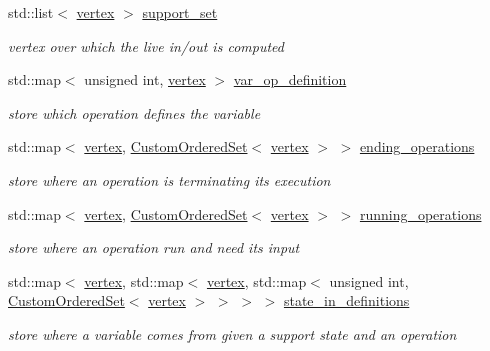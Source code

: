 \begin{DoxyCompactItemize}
std\+::list$<$ \hyperlink{graph_8hpp_abefdcf0544e601805af44eca032cca14}{vertex} $>$ \hyperlink{classliveness_a5b11078a7c95877d980deebb160d8f08}{support\+\_\+set}
\begin{DoxyCompactList}\small\item\em vertex over which the live in/out is computed \end{DoxyCompactList}\item 
std\+::map$<$ unsigned int, \hyperlink{graph_8hpp_abefdcf0544e601805af44eca032cca14}{vertex} $>$ \hyperlink{classliveness_a834fd1b22c28f08bb6b7e2cacf4d09e2}{var\+\_\+op\+\_\+definition}
\begin{DoxyCompactList}\small\item\em store which operation defines the variable \end{DoxyCompactList}\item 
std\+::map$<$ \hyperlink{graph_8hpp_abefdcf0544e601805af44eca032cca14}{vertex}, \hyperlink{classCustomOrderedSet}{Custom\+Ordered\+Set}$<$ \hyperlink{graph_8hpp_abefdcf0544e601805af44eca032cca14}{vertex} $>$ $>$ \hyperlink{classliveness_ac3be9cc9f8b3cbe5add476031ee9edb7}{ending\+\_\+operations}
\begin{DoxyCompactList}\small\item\em store where an operation is terminating its execution \end{DoxyCompactList}\item 
std\+::map$<$ \hyperlink{graph_8hpp_abefdcf0544e601805af44eca032cca14}{vertex}, \hyperlink{classCustomOrderedSet}{Custom\+Ordered\+Set}$<$ \hyperlink{graph_8hpp_abefdcf0544e601805af44eca032cca14}{vertex} $>$ $>$ \hyperlink{classliveness_ab36352fe1ee3f7dbd623241db60c625e}{running\+\_\+operations}
\begin{DoxyCompactList}\small\item\em store where an operation run and need its input \end{DoxyCompactList}\item 
std\+::map$<$ \hyperlink{graph_8hpp_abefdcf0544e601805af44eca032cca14}{vertex}, std\+::map$<$ \hyperlink{graph_8hpp_abefdcf0544e601805af44eca032cca14}{vertex}, std\+::map$<$ unsigned int, \hyperlink{classCustomOrderedSet}{Custom\+Ordered\+Set}$<$ \hyperlink{graph_8hpp_abefdcf0544e601805af44eca032cca14}{vertex} $>$ $>$ $>$ $>$ \hyperlink{classliveness_aaaa2200ef463cbb91af1f689f77e7e4c}{state\+\_\+in\+\_\+definitions}
\begin{DoxyCompactList}\small\item\em store where a variable comes from given a support state and an operation \end{DoxyCompactList}\item 

\end{DoxyCompactItemize}

